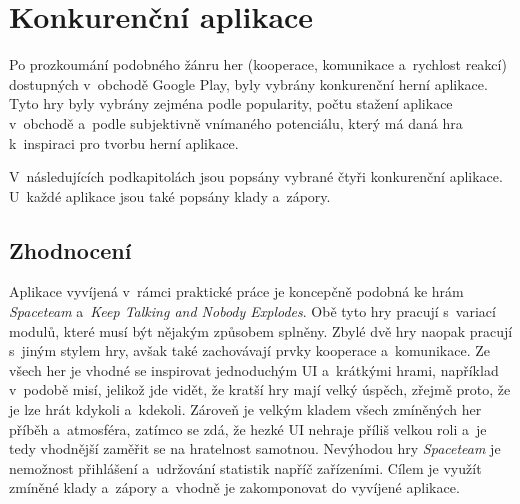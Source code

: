 \chapter{Konkurenční aplikace}
\label{chap:competitive-apps}

Po prozkoumání podobného žánru her
(kooperace, komunikace a~rychlost reakcí)
dostupných v~obchodě Google Play,
byly vybrány konkurenční herní aplikace.
Tyto hry byly vybrány zejména podle popularity,
počtu stažení aplikace v~obchodě
a~podle subjektivně vnímaného potenciálu,
který má daná hra k~inspiraci pro tvorbu herní aplikace.

V~následujících podkapitolách jsou popsány vybrané čtyři konkurenční aplikace.
U~každé aplikace jsou také popsány klady a~zápory.






\section{Zhodnocení}

Aplikace vyvíjená v~rámci praktické práce je koncepčně podobná ke hrám
\emph{Spaceteam} a~\emph{Keep Talking and Nobody Explodes}.
Obě tyto hry pracují s~variací modulů,
které musí být nějakým způsobem splněny.
Zbylé dvě hry naopak pracují s~jiným stylem hry,
avšak také zachovávají prvky kooperace a~komunikace.
Ze všech her je vhodné se inspirovat jednoduchým UI a~krátkými hrami,
například v~podobě misí,
jelikož jde vidět,
že kratší hry mají velký úspěch,
zřejmě proto,
že je lze hrát kdykoli a~kdekoli.
Zároveň je velkým kladem všech zmíněných her příběh a~atmosféra,
zatímco se zdá,
že hezké UI nehraje příliš velkou roli
a~je tedy vhodnější zaměřit se na hratelnost samotnou.
Nevýhodou hry \emph{Spaceteam} je nemožnost přihlášení a~udržování statistik
napříč zařízeními.
Cílem je využít zmíněné klady a~zápory a~vhodně je zakomponovat do vyvíjené
aplikace.
